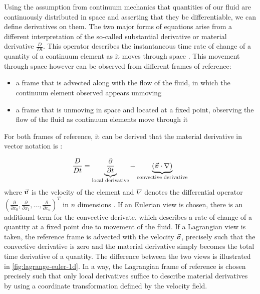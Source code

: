 Using the assumption from continuum mechanics that quantities of our fluid are continuously distributed in space and asserting that they be differentiable, we can define derivatives on them. The two major forms of equations arise from a different interpretation of the so-called substantial derivative\autocite*{anderson} or material derivative\autocite*{tutorial} $\frac{D}{Dt}$. This operator describes the instantaneous time rate of change of a quantity of a continuum element as it moves through space \autocite*{anderson}. This movement through space however can be observed from different frames of reference:
\begin{itemize}
    \item a frame that is advected along with the flow of the fluid, in which the continuum element observed appears unmoving
    \item a frame that is unmoving in space and located at a fixed point, observing the flow of the fluid as continuum elements move through it
\end{itemize}

For both frames of reference, it can be derived that the material derivative in vector notation is \autocite*{anderson}:

\begin{align}
    \frac{D}{Dt} = \underbrace{\frac{\partial }{\partial t}}_{\text{local derivative}} + \underbrace{(\vec{\bm{v}}\cdot \nabla)}_{\text{convective derivative}}
\end{align}
where $\vec{\bm{v}}$ is the velocity of the element and $\nabla$ denotes the differential operator $\left(\frac{\partial}{\partial x_0}, \frac{\partial}{\partial x_1}, \dots,  \frac{\partial}{\partial x_n}\right)^T$ in $n$ dimensions \autocite*{anderson}. If an Eulerian view is chosen, there is an additional term for the convective derivate, which describes a rate of change of a quantity at a fixed point due to movement of the fluid. If a Lagrangian view is taken, the reference frame is advected with the velocity $\vec{\bm{v}}$, precisely such that the convective derivative is zero and the material derivative simply becomes the total time derivative of a quantity. The difference between the two views is illustrated in \autoref{fig:lagrange-euler-1d}. In a way, the Lagrangian frame of reference is chosen precisely such that only local derivatives suffice to describe material derivatives by using a coordinate transformation defined by the velocity field.

